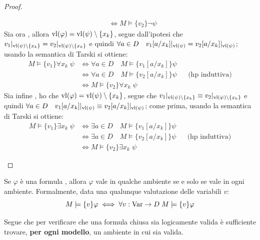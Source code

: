 \begin{proof}
\begin{itemize}
\begin{align*}
                &\iff M \models \{v_2\} \neg \psi
            \end{align*}
            Sia ora , allora $\operatorname{vl}(\varphi) = \operatorname{vl}(\psi) \setminus \{x_k\}$, segue dall'ipotesi che $v_1|_{\operatorname{vl}(\psi)\setminus\{x_k\}} = v_2|_{\operatorname{vl}(\psi)\setminus\{x_k\}}$ e quindi $\forall a \in D \quad v_1[a/x_k]|_{\operatorname{vl}(\psi)} = v_2[a/x_k]|_{\operatorname{vl}(\psi)}$; usando la semantica di Tarski si ottiene:
            \begin{align*}
                M \models \{v_1\} \forall x_k \; \psi
                &\iff \forall a \in D \quad M \models \{v_1[a/x_k]\} \psi \\
                &\iff \forall a \in D \quad M \models \{v_2[a/x_k]\} \psi &&\text{(hp induttiva)} \\
                &\iff M \models \{v_2\} \forall x_k \; \psi
            \end{align*}
            Sia infine , ho che $\operatorname{vl}(\varphi) = \operatorname{vl}(\psi) \setminus \{x_k\}$, segue che $v_1|_{\operatorname{vl}(\psi)\setminus\{x_k\}} \equiv v_2|_{\operatorname{vl}(\psi)\setminus\{x_k\}}$ e quindi $\forall a \in D \quad v_1[a/x_k]|_{\operatorname{vl}(\psi)} \equiv v_2[a/x_k]|_{\operatorname{vl}(\psi)}$; come prima, usando la semantica di Tarski si ottiene:
            \begin{align*}
                M \models \{v_1\} \exists x_k \; \psi
                &\iff \exists a \in D \quad M \models \{v_1[a/x_k]\} \psi \\
                &\iff \exists a \in D \quad M \models \{v_2[a/x_k]\} \psi &&\text{(hp induttiva)}\\
                &\iff M \models \{v_2\} \exists x_k \; \psi
            \end{align*}
    \end{itemize}
\end{proof}

\begin{corollary}
    Se $\varphi$ è una formula , allora $\varphi$ vale in qualche ambiente se e solo se vale in ogni ambiente. Formalmente, data una qualunque valutazione delle variabili $v$:
    \[ M \models \{v\} \varphi \iff \forall v : \operatorname{Var} \to D \; M \models\{v\}\varphi
    \]
\end{corollary}

Segue che per verificare che una formula chiusa sia logicamente valida è sufficiente trovare, \textbf{per ogni modello}, un ambiente in cui sia valida.

